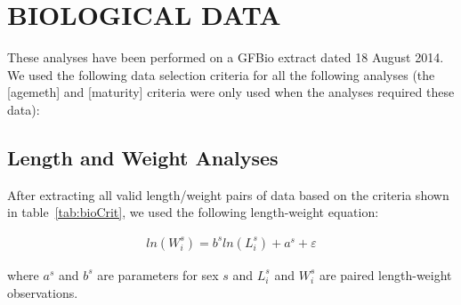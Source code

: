 


\clearpage

\chapter{BIOLOGICAL DATA}

These analyses have been performed on a GFBio extract dated 18 August 2014. We used the following data selection criteria for all the following analyses (the [agemeth] and [maturity] criteria were only used when the analyses required these data):

\section{Length and Weight Analyses}

After extracting all valid length/weight pairs of data based on the criteria shown in table~\ref{tab:bioCrit}, we used the following length-weight equation:

\begin{align} \label{eq:lw}
ln(W_i^s) = b^sln(L_i^s) + a^s + \varepsilon
\end{align}
\begin{addmargin}[3em]{1em}
where $a^s$ and $b^s$ are parameters for sex $s$ and $L_i^s$ and $W_i^s$ are paired length-weight observations.
\end{addmargin}

